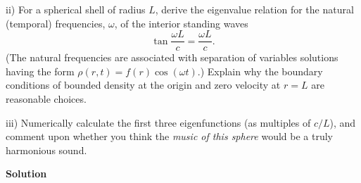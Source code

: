\documentclass{article}
\begin{document}
ii) For a spherical shell of radius $L$, derive the eigenvalue relation
for the natural (temporal) frequencies, $\omega$, of the interior
standing waves
%
\begin{equation*}
    \tan \frac{\omega L}{c} = \frac{\omega L}{c}
    .
\end{equation*}
%
(The natural frequencies are associated with separation of variables
solutions having the form $\rho(r, t) = f(r) \cos(\omega t)$.) Explain
why the boundary conditions of bounded density at the origin and zero
velocity at $r = L$ are reasonable choices.

iii) Numerically calculate the first three eigenfunctions (as multiples of
$c / L$), and comment upon whether you think the \textit{music of this sphere}
would be a truly harmonious sound.

\newpage

\textbf{Solution}
\end{document}
